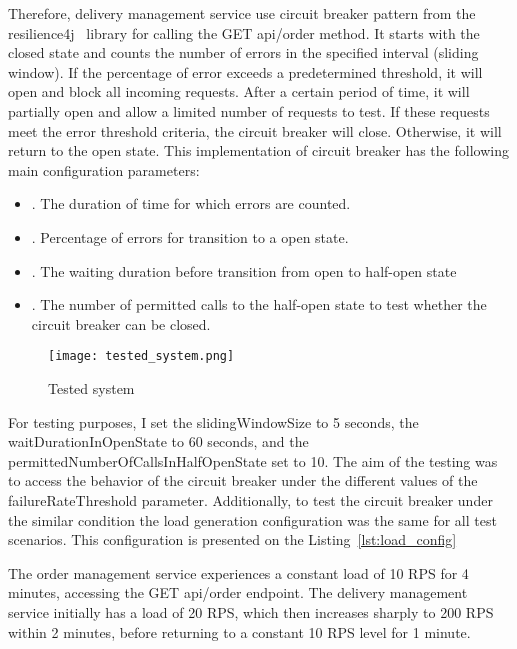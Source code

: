 Therefore, delivery management service use circuit breaker pattern from the resilience4j~\cite{resilience4j} library for calling the GET api/order method. It starts with the closed state and counts the number of errors in the specified interval (sliding window). If the percentage of error exceeds a predetermined threshold, it will open and block all incoming requests. After a certain period of time, it will partially open and allow a limited number of requests to test. If these requests meet the error threshold criteria, the circuit breaker will close. Otherwise, it will return to the open state. This implementation of circuit breaker has the following main configuration parameters:
\begin{itemize}
    \item {}. The duration of time for which errors are counted.
    \item {}. Percentage of errors for transition to a open state.
    \item {}. The waiting duration before transition from open to half-open state
    \item {}. The number of permitted calls to the half-open state to test whether the circuit breaker can be closed.
\end{itemize}

\begin{figure}[t]
    \centering
    \texttt{[image: tested\_system.png]}
    \caption{Tested system}
    \label{fig:tested-system}
\end{figure}


For testing purposes, I set the slidingWindowSize to 5 seconds, the waitDurationInOpenState to 60 seconds, and the permittedNumberOfCallsInHalfOpenState set to 10. The aim of the testing was to access the behavior of the circuit breaker under the different values of the failureRateThreshold parameter. Additionally, to test the circuit breaker under the similar condition the load generation configuration was the same for all test scenarios. This configuration is presented on the Listing~\ref{lst:load_config}

The order management service experiences a constant load of 10 RPS for 4 minutes, accessing the GET api/order endpoint.
The delivery management service initially has a load of 20 RPS, which then increases sharply to 200 RPS within 2 minutes, before returning to a constant 10 RPS level for 1 minute.

